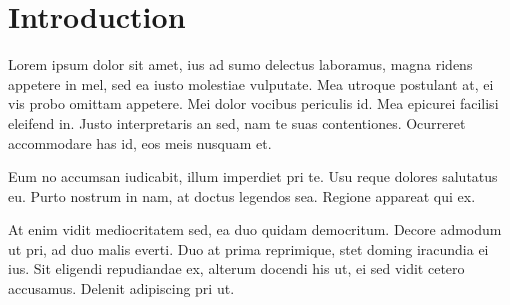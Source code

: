 \section{Introduction}

Lorem ipsum dolor sit amet, ius ad sumo delectus laboramus, magna ridens appetere in mel, sed ea iusto molestiae vulputate. Mea utroque postulant at, ei vis probo omittam appetere. Mei dolor vocibus periculis id. Mea epicurei facilisi eleifend in. Justo interpretaris an sed, nam te suas contentiones. Ocurreret accommodare has id, eos meis nusquam et.

Eum no accumsan iudicabit, illum imperdiet pri te. Usu reque dolores salutatus eu. Purto nostrum in nam, at doctus legendos sea. Regione appareat qui ex.

At enim vidit mediocritatem sed, ea duo quidam democritum. Decore admodum ut pri, ad duo malis everti. Duo at prima reprimique, stet doming iracundia ei ius. Sit eligendi repudiandae ex, alterum docendi his ut, ei sed vidit cetero accusamus. Delenit adipiscing pri ut.